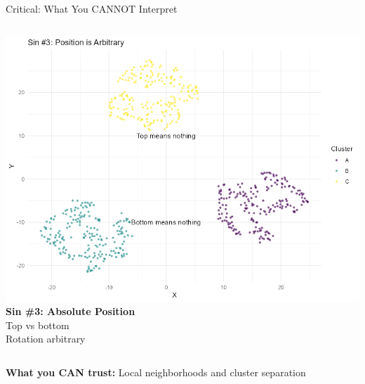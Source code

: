 \documentclass[aspectratio=169]{beamer}
\begin{document}
\begin{frame}{Critical: What You CANNOT Interpret}
\begin{columns}
    \includegraphics[width=\textwidth]{./Figures/sin3_position.png}
    \textbf{Sin \#3: Absolute Position}\\
      Top vs bottom\\
      Rotation arbitrary
      \end{columns}
      
      \vspace{0.3cm}
      \colorbox{green!30}{\textbf{What you CAN trust:} Local neighborhoods and cluster separation}
      \end{frame}
      
\end{document}
